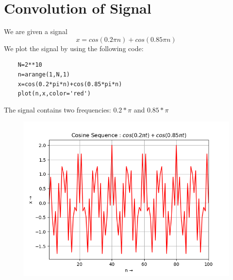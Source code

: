 \documentclass[11pt, a4paper]{article}
\begin{document}
\section{Convolution of Signal}
We are given a signal
\begin{equation*}
    x = cos(0.2\pi n) + cos(0.85\pi n)
\end{equation*}
We plot the signal by using the following code:
\begin{verbatim}
    N=2**10
    n=arange(1,N,1)
    x=cos(0.2*pi*n)+cos(0.85*pi*n)
    plot(n,x,color='red')
\end{verbatim}
The signal contains two frequencies: $0.2*\pi$ and $0.85*\pi$
\begin{figure}[H]
   	\centering
   	\includegraphics[scale=0.5]{Figure_2.png}
\end{figure}
\end{document}
